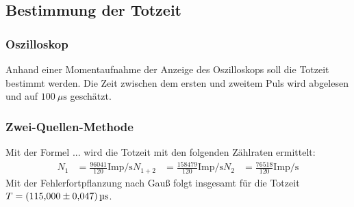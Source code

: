 \subsection{Bestimmung der Totzeit}
\label{subsec:Totzeit}

\subsubsection{Oszilloskop}
Anhand einer Momentaufnahme der Anzeige des Oszilloskops soll die Totzeit bestimmt werden.
Die Zeit zwischen dem ersten und zweitem Puls wird abgelesen und auf $\SI{100}{\mu\second}$ geschätzt.

\subsubsection{Zwei-Quellen-Methode}
Mit der Formel ... wird die Totzeit mit den folgenden Zählraten ermittelt:
\begin{align*}
  N_1 &= \frac{96041}{120} \text{Imp/s}
  N_{1+2} &= \frac{158479}{120} \text{Imp/s}
  N_2 &= \frac{76518}{120} \text{Imp/s}
\end{align*}
Mit der Fehlerfortpflanzung nach Gauß folgt insgesamt für die Totzeit $T = \SI{115 \pm 0.047}{\micro\second}$.